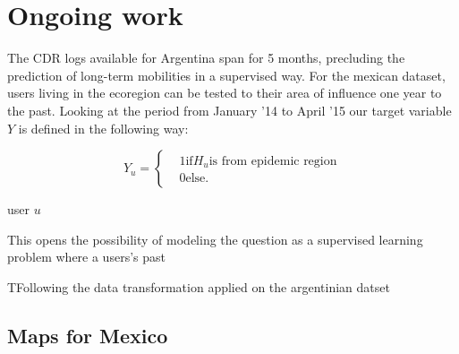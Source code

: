 \section{Ongoing work}

The CDR logs available for Argentina span for 5 months, precluding the prediction of long-term mobilities in a supervised way. For the mexican dataset, users living in the ecoregion can be tested to their area of influence one year to the past. Looking at the period from January '14 to April '15 our target variable $Y $ is defined in the following way: 

\[
    Y_u =
      \begin{cases}
        &1 \mbox{if} H_u \mbox{is from epidemic region}\\
        &0 \mbox{else}.
      \end{cases}
    \]

user $u$ 

This opens the possibility of modeling the question as a supervised learning problem where a users's past 

TFollowing the data transformation applied on the argentinian datset

\subsection{Maps for Mexico}